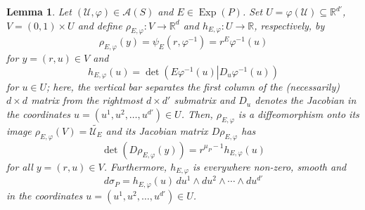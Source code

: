 \documentclass[11pt, letter]{book}
\newtheorem{lemma}[theorem]{Lemma}
\newcommand\Exp{\operatorname{Exp}}
\renewcommand\det{\operatorname{det}}
\begin{document}
\begin{framed}
\begin{lemma}\label{lem:JacobianRelation}
Let $(\mathcal{U},\varphi)\in \mathcal{A}(S)$ and $E\in\Exp(P)$. Set $U=\varphi(\mathcal{U})\subseteq\mathbb{R}^{d'}$, $V=(0,1)\times U$ and define $\rho_{E,\varphi}:V\to \mathbb{R}^d$ and $h_{E,\varphi}:U\to \mathbb{R}$, respectively, by
\begin{equation*}
    \rho_{E,\varphi}(y)=\psi_E(r,\varphi^{-1})=r^E\varphi^{-1}(u)
\end{equation*}
for $y=(r,u)\in V$ and
\begin{equation*}
    h_{E,\varphi}(u)=\det\left.\left(E\varphi^{-1}(u)\right\vert D_u\varphi^{-1}(u)\right)
\end{equation*}
for $u\in U$; here, the vertical bar separates the first column of the (necessarily) $d\times d$ matrix from the rightmost $d\times d'$ submatrix and $D_u$ denotes the Jacobian in the coordinates $u=(u^1,u^2,\dots,u^{d'})\in U$. Then, $\rho_{E,\varphi}$ is a diffeomorphism onto its image $\rho_{E,\varphi}(V)=\widetilde{\mathcal{U}_E}$ and its Jacobian matrix $D\rho_{E,\varphi}$ has
\begin{equation}\label{eq:JacobianRelation1}
    \det(D\rho_{E,\varphi}(y))=r^{\mu_P-1}h_{E,\varphi}(u)
\end{equation}
for all $y=(r,u)\in V$. Furthermore, $h_{E,\varphi}$ is everywhere non-zero, smooth and
\begin{equation}\label{eq:JacobianRelation2}
    d\sigma_P=h_{E,\varphi}(u)\,du^1\wedge du^2\wedge\cdots\wedge du^{d'}
\end{equation}
in the coordinates $u=(u^1,u^2,\dots,u^{d'})\in U$. 
\end{lemma}
\end{framed}
\end{document}
